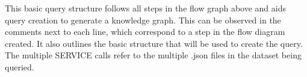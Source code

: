 This basic query structure follows all steps in the flow graph above and aids query creation to generate a knowledge graph. This can be observed in the comments next to each line, which correspond to a step in the flow diagram created. It also outlines the basic structure that will be used to create the query. The multiple SERVICE calls refer to the multiple .json files in the dataset being queried. 

